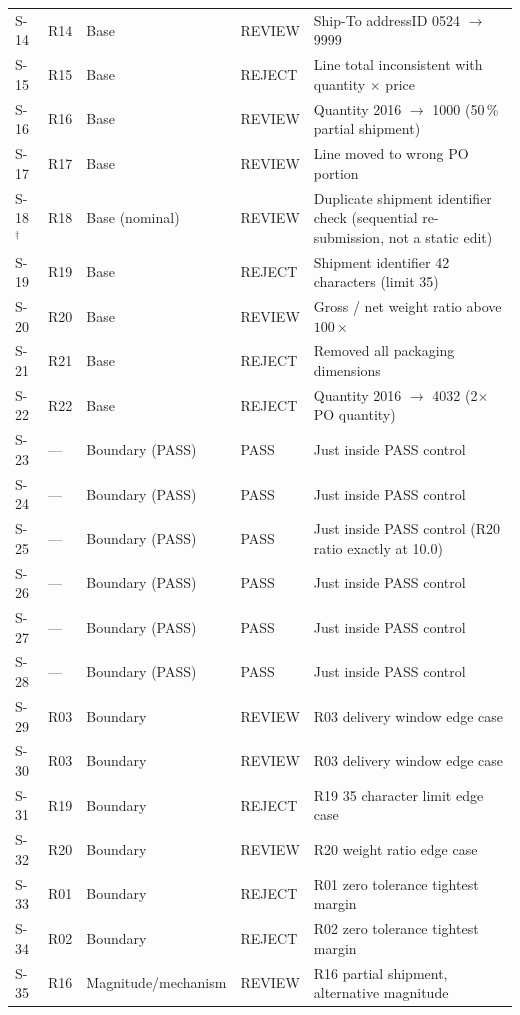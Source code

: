 \begin{longtable}{@{}llllp{6.5cm}@{}}
S-14 & R14 & Base & REVIEW & Ship-To addressID 0524 $\to$ 9999 \\
S-15 & R15 & Base & REJECT & Line total inconsistent with quantity $\times$ price \\
S-16 & R16 & Base & REVIEW & Quantity 2016 $\to$ 1000 (50\,\% partial shipment) \\
S-17 & R17 & Base & REVIEW & Line moved to wrong PO portion \\
S-18$^{\dagger}$ & R18 & Base (nominal) & REVIEW & Duplicate shipment identifier check (sequential re-submission, not a static edit) \\
S-19 & R19 & Base & REJECT & Shipment identifier 42 characters (limit 35) \\
S-20 & R20 & Base & REVIEW & Gross / net weight ratio above $100\times$ \\
S-21 & R21 & Base & REJECT & Removed all packaging dimensions \\
S-22 & R22 & Base & REJECT & Quantity 2016 $\to$ 4032 (2$\times$ PO quantity) \\
\midrule
S-23 & --- & Boundary (PASS) & PASS  & Just inside PASS control \\
S-24 & --- & Boundary (PASS) & PASS  & Just inside PASS control \\
S-25 & --- & Boundary (PASS) & PASS  & Just inside PASS control (R20 ratio exactly at 10.0) \\
S-26 & --- & Boundary (PASS) & PASS  & Just inside PASS control \\
S-27 & --- & Boundary (PASS) & PASS  & Just inside PASS control \\
S-28 & --- & Boundary (PASS) & PASS  & Just inside PASS control \\
S-29 & R03 & Boundary        & REVIEW & R03 delivery window edge case \\
S-30 & R03 & Boundary        & REVIEW & R03 delivery window edge case \\
S-31 & R19 & Boundary        & REJECT & R19 35 character limit edge case \\
S-32 & R20 & Boundary        & REVIEW & R20 weight ratio edge case \\
S-33 & R01 & Boundary        & REJECT & R01 zero tolerance tightest margin \\
S-34 & R02 & Boundary        & REJECT & R02 zero tolerance tightest margin \\
\midrule
S-35 & R16 & Magnitude/mechanism        & REVIEW & R16 partial shipment, alternative magnitude \\

\end{longtable}
